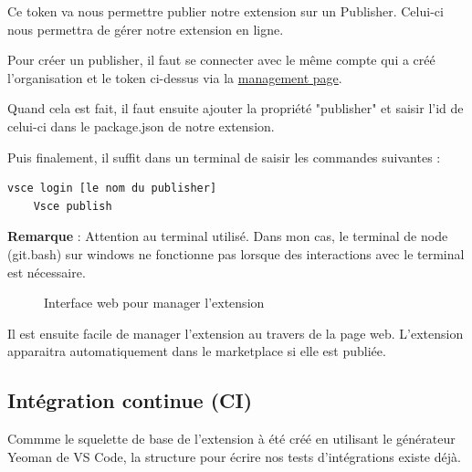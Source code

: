 \documentclass[
    iict, %
    il, %
]{heig-tb}
\begin{document}
Ce token va nous permettre publier notre extension sur un Publisher. Celui-ci nous permettra de gérer notre extension en ligne.

Pour créer un publisher, il faut se connecter avec le même compte qui a créé l'organisation et le token ci-dessus via la \href{https://marketplace.visualstudio.com/manage/publishers/}{management page}.

Quand cela est fait, il faut ensuite ajouter la propriété "publisher" et saisir l'id de celui-ci dans le package.json de notre extension.

Puis finalement, il suffit dans un terminal de saisir les commandes suivantes :
\begin{lstlisting}[frame=single]
    vsce login [le nom du publisher]
    Vsce publish
\end{lstlisting}

\textbf{Remarque} : Attention au terminal utilisé. Dans mon cas, le terminal de node (git.bash) sur windows ne fonctionne pas lorsque des interactions avec le terminal est nécessaire.

\begin{figure}[!h]
    \begin{center}
    \end{center}
    \caption[Interface web pour manager l'extension]{\label{manage-publisher} Interface web pour manager l'extension}
\end{figure}

Il est ensuite facile de manager l'extension au travers de la page web.
L'extension apparaitra automatiquement dans le marketplace si elle est publiée.

\subsection{Intégration continue (CI)}

Commme le squelette de base de l'extension à été créé en utilisant le générateur Yeoman de VS Code, la structure pour écrire nos tests d'intégrations
existe déjà.
\end{document}
